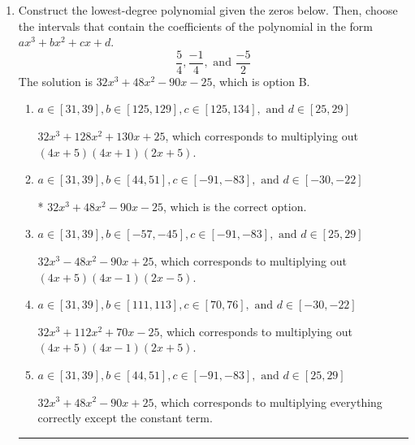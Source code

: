 \documentclass{extbook}[14pt]
\newcommand{\litem}[1]{\item #1

\rule{\textwidth}{0.4pt}}
\begin{document}
\begin{enumerate}\litem{
Construct the lowest-degree polynomial given the zeros below. Then, choose the intervals that contain the coefficients of the polynomial in the form $ax^3+bx^2+cx+d$.
\[ \frac{5}{4}, \frac{-1}{4}, \text{ and } \frac{-5}{2} \]The solution is \( 32x^{3} +48 x^{2} -90 x -25 \), which is option B.\begin{enumerate}[label=\Alph*.]
\item \( a \in [31, 39], b \in [125, 129], c \in [125, 134], \text{ and } d \in [25, 29] \)

$32x^{3} +128 x^{2} +130 x + 25$, which corresponds to multiplying out $(4x + 5)(4x + 1)(2x + 5)$.
\item \( a \in [31, 39], b \in [44, 51], c \in [-91, -83], \text{ and } d \in [-30, -22] \)

* $32x^{3} +48 x^{2} -90 x -25$, which is the correct option.
\item \( a \in [31, 39], b \in [-57, -45], c \in [-91, -83], \text{ and } d \in [25, 29] \)

$32x^{3} -48 x^{2} -90 x + 25$, which corresponds to multiplying out $(4x + 5)(4x -1)(2x -5)$.
\item \( a \in [31, 39], b \in [111, 113], c \in [70, 76], \text{ and } d \in [-30, -22] \)

$32x^{3} +112 x^{2} +70 x -25$, which corresponds to multiplying out $(4x + 5)(4x -1)(2x + 5)$.
\item \( a \in [31, 39], b \in [44, 51], c \in [-91, -83], \text{ and } d \in [25, 29] \)

$32x^{3} +48 x^{2} -90 x + 25$, which corresponds to multiplying everything correctly except the constant term.
\end{enumerate}

}
\end{enumerate}
\end{document}
